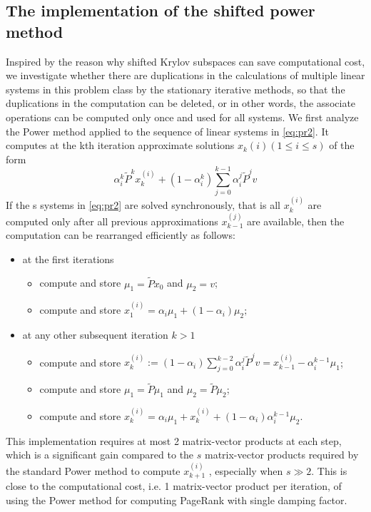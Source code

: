 \documentclass[12pt]{article}
\begin{document}
\subsection{The implementation of the shifted power method}
Inspired by the reason why shifted Krylov subspaces can save computational cost, we investigate whether there are duplications in the calculations of multiple linear systems in this problem class by the stationary iterative methods, so that the duplications in the computation can be deleted, or in other words, the associate operations can be computed only once and used for all systems. We first analyze the Power method applied to the sequence of linear systems in \ref{eq:pr2}.  It computes
at the kth iteration approximate solutions $x_k (i) (1 \leq i \leq s)$ of the form
\begin{equation}
    \alpha_i^k \tilde P^k x_k^{(i)} + (1 - \alpha_i^k) \sum_{j=0}^{k-1} \alpha_i^j \tilde P^j v
\end{equation}
If the s systems in \ref{eq:pr2} are solved synchronously, that is all $x^{(i)}_k$ are computed only after all previous approximations $x^(j)_{k-1}$ are available, then the computation can be rearranged efficiently as follows:
\begin{itemize}
    \item at the first iterations
        \begin{itemize}
            \item compute and store $\mu_1 = \tilde P x_0$ and $\mu_2 = v$;
            \item compute and store $x_1^(i) = \alpha_i \mu_1 + (1-\alpha_i)\mu_2;$
        \end{itemize}
    \item at any other subsequent iteration $k>1$
        \begin{itemize}
            \item compute and store $x_k^(i) := (1-\alpha_i)\sum_{j=0}^{k-2} \alpha_i^j \tilde P^j v= x_{k-1}^{(i)} - \alpha_i^{k-1} \mu_1$;
            \item compute and store $\mu_1 = \tilde P \mu_1$ and $\mu_2 = \tilde P \mu_2$;
            \item compute and store $x_k^{(i)} = \alpha_i \mu_1 + x_k^{(i)} + (1-\alpha_i)\alpha^{k-1}_i \mu_2$.
        \end{itemize}
\end{itemize}
This implementation requires at most 2 matrix-vector products at each step, which is a significant gain compared to the $s$ matrix-vector products required by the standard Power method to compute $x^{(i)}_{k+1}$ , especially when $s \gg 2$. This is close to the computational cost, i.e. 1 matrix-vector product per iteration, of using the Power method for computing PageRank with single damping factor. \\
\end{document}
